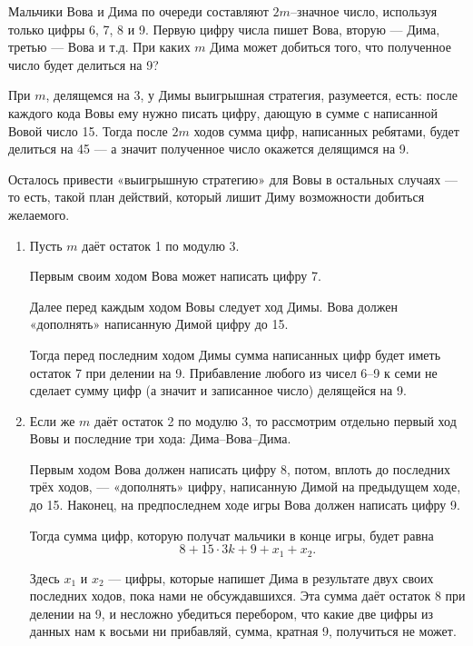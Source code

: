 \begin{itemize}

	\itC Мальчики Вова и Дима по очереди составляют $2m$--значное число, используя только цифры 6, 7, 8 и 9. Первую цифру числа пишет Вова, вторую — Дима, третью — Вова и т.д. При каких $m$ Дима может добиться того, что полученное число будет делиться на 9?
	
	\itr При $m$, делящемся на 3, у Димы выигрышная стратегия, разумеется, есть: после каждого кода Вовы ему нужно писать цифру, дающую в сумме с написанной Вовой число 15. Тогда после $2m$ ходов сумма цифр, написанных ребятами, будет делиться на 45 — а значит полученное число окажется делящимся на 9.
	
	Осталось привести «выигрышную стратегию» для Вовы в остальных случаях — то есть, такой план действий, который лишит Диму возможности добиться желаемого.
	
	\begin{enumerate}[label=\arabic*.]
	
	\item Пусть $m$ даёт остаток 1 по модулю 3.
	
	Первым своим ходом Вова может написать цифру 7.
	
	Далее перед каждым ходом Вовы следует ход Димы. Вова должен «дополнять» написанную Димой цифру до 15.
	
	Тогда перед последним ходом Димы сумма написанных цифр будет иметь остаток 7 при делении на 9. Прибавление любого из чисел 6–9 к семи не сделает сумму цифр (а значит и записанное число) делящейся на 9.
	
	\item Если же $m$ даёт остаток 2 по модулю 3, то рассмотрим отдельно первый ход Вовы и последние три хода: Дима–Вова–Дима.
	
	Первым ходом Вова должен написать цифру 8, потом, вплоть до последних трёх ходов, — «дополнять» цифру, написанную Димой на предыдущем ходе, до 15. Наконец, на предпоследнем ходе игры Вова должен написать цифру 9.
	
	Тогда сумма цифр, которую получат мальчики в конце игры, будет равна
	$$8 + 15 \cdot 3k + 9 + x_1 + x_2.$$
	
	Здесь $x_1$ и $x_2$ — цифры, которые напишет Дима в результате двух своих последних ходов, пока нами не обсуждавшихся. Эта сумма даёт остаток 8 при делении на 9, и несложно убедиться перебором, что какие две цифры из данных нам к восьми ни прибавляй, сумма, кратная 9, получиться не может. 
	
	\end{enumerate}

\end{itemize}

